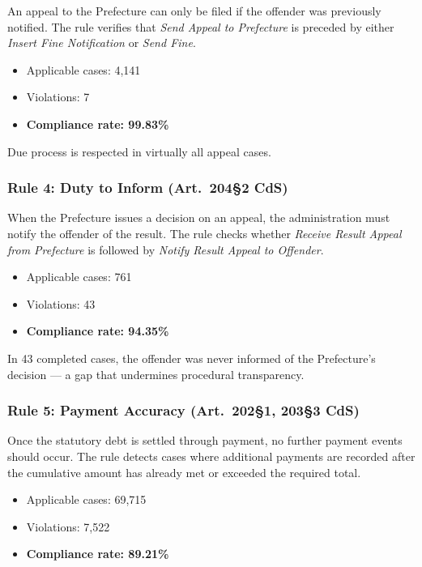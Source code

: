 An appeal to the Prefecture can only be filed if the offender was previously notified. The rule verifies that \textit{Send Appeal to Prefecture} is preceded by either \textit{Insert Fine Notification} or \textit{Send Fine}.

\begin{itemize}
    \item Applicable cases: 4,141
    \item Violations: 7
    \item \textbf{Compliance rate: 99.83\%}
\end{itemize}

Due process is respected in virtually all appeal cases.

\subsubsection{Rule 4: Duty to Inform (Art.\ 204\S2 CdS)}

When the Prefecture issues a decision on an appeal, the administration must notify the offender of the result. The rule checks whether \textit{Receive Result Appeal from Prefecture} is followed by \textit{Notify Result Appeal to Offender}.

\begin{itemize}
    \item Applicable cases: 761
    \item Violations: 43
    \item \textbf{Compliance rate: 94.35\%}
\end{itemize}

In 43 completed cases, the offender was never informed of the Prefecture's decision — a gap that undermines procedural transparency.

\subsubsection{Rule 5: Payment Accuracy (Art.\ 202\S1, 203\S3 CdS)}

Once the statutory debt is settled through payment, no further payment events should occur. The rule detects cases where additional payments are recorded after the cumulative amount has already met or exceeded the required total.

\begin{itemize}
    \item Applicable cases: 69,715
    \item Violations: 7,522
    \item \textbf{Compliance rate: 89.21\%}
\end{itemize}

